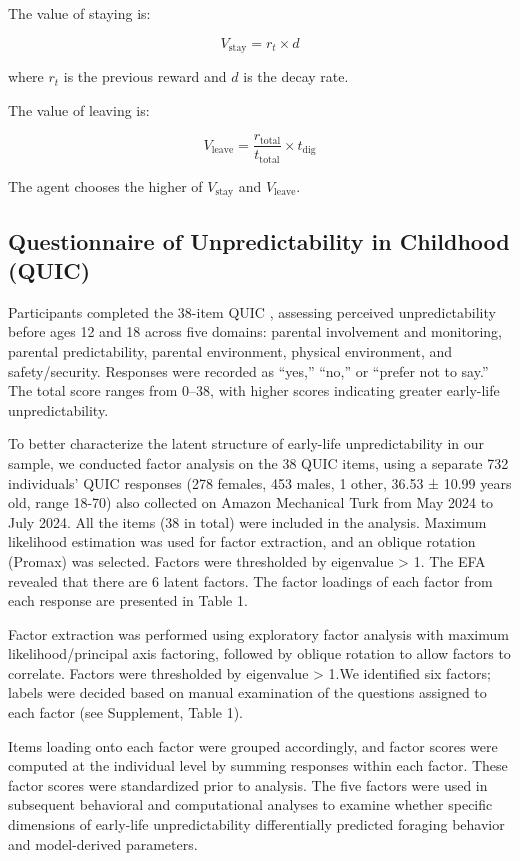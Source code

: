 \documentclass[12pt]{article}
\begin{document}
The value of staying is:

\[
V_{\text{stay}} = r_t \times d
\]

where \( r_t \) is the previous reward and \( d \) is the decay rate.

The value of leaving is:

\[
V_{\text{leave}} = \frac{r_{\text{total}}}{t_{\text{total}}} \times t_{\text{dig}}
\]

The agent chooses the higher of \( V_{\text{stay}} \) and \( V_{\text{leave}} \).



\subsection*{Questionnaire of Unpredictability in Childhood (QUIC)}

Participants completed the 38-item QUIC \citep{glynn2019measuring}, assessing perceived unpredictability before ages 12 and 18 across five domains: parental involvement and monitoring, parental predictability, parental environment, physical environment, and safety/security. Responses were recorded as “yes,” “no,” or “prefer not to say.” The total score ranges from 0–38, with higher scores indicating greater early-life unpredictability.

To better characterize the latent structure of early-life unpredictability in our sample, we conducted factor analysis on the 38 QUIC items, using a separate 732 individuals’ QUIC responses (278 females, 453 males, 1 other, 36.53 ± 10.99 years old, range 18-70) also collected on Amazon Mechanical Turk from May 2024 to July 2024. All the items (38 in total) were included in the analysis. Maximum likelihood estimation was used for factor extraction, and an oblique rotation (Promax) was selected. Factors were thresholded by eigenvalue > 1. The EFA revealed that there are 6 latent factors. The factor loadings of each factor from each response are presented in Table 1.
 
Factor extraction was performed using exploratory factor analysis with maximum likelihood/principal axis factoring, followed by oblique rotation to allow factors to correlate. Factors were thresholded by eigenvalue > 1.We identified six factors; labels were decided based on manual examination of the questions assigned to each factor (see Supplement, Table 1). 

Items loading onto each factor were grouped accordingly, and factor scores were computed at the individual level by summing responses within each factor. These factor scores were standardized prior to analysis. The five factors were used in subsequent behavioral and computational analyses to examine whether specific dimensions of early-life unpredictability differentially predicted foraging behavior and model-derived parameters.
\end{document}
